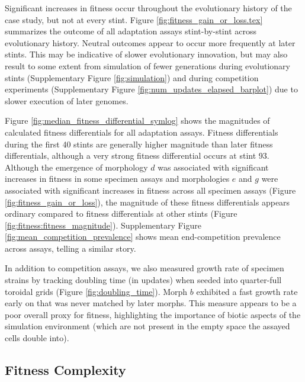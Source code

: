 Significant increases in fitness occur throughout the evolutionary history of the case study, but not at every stint.
Figure \ref{fig:fitness_gain_or_loss.tex} summarizes the outcome of all adaptation assays stint-by-stint across evolutionary history.
Neutral outcomes appear to occur more frequently at later stints.
This may be indicative of slower evolutionary innovation, but may also result to some extent from simulation of fewer generations during evolutionary stints (Supplementary Figure \ref{fig:simulation}) and during competition experiments (Supplementary Figure \ref{fig:num_updates_elapsed_barplot}) due to slower execution of later genomes.



Figure \ref{fig:median_fitness_differential_symlog} shows the magnitudes of calculated fitness differentials for all adaptation assays.
Fitness differentials during the first 40 stints are generally higher magnitude than later fitness differentials, although a very strong fitness differential occurs at stint 93.
Although the emergence of morphology $d$ was associated with significant increases in fitness in some specimen assays and morphologies $e$ and $g$ were associated with significant increases in fitness across all specimen assays (Figure \ref{fig:fitness_gain_or_loss}), the magnitude of these fitness differentials appears ordinary compared to fitness differentials at other stints (Figure \ref{fig:fitness:fitness_magnitude}).
Supplementary Figure \ref{fig:mean_competition_prevalence} shows mean end-competition prevalence across assays, telling a similar story.



In addition to competition assays, we also measured growth rate of specimen strains by tracking doubling time (in updates) when seeded into quarter-full toroidal grids (Figure \ref{fig:doubling_time}).
Morph $b$ exhibited a fast growth rate early on that was never matched by later morphs.
This measure appears to be a poor overall proxy for fitness, highlighting the importance of biotic aspects of the simulation environment (which are not present in the empty space the assayed cells double into).


\subsection{Fitness Complexity}



